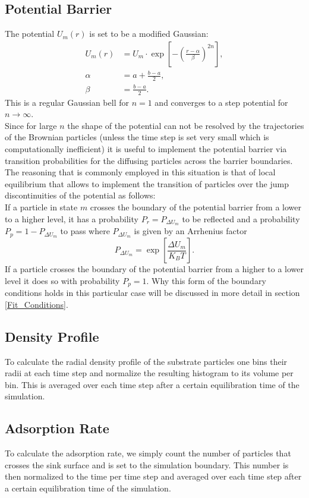 \subsection{Potential Barrier}
The potential $U_m(r)$ is set to be a modified Gaussian:
\begin{align}
    U_m(r) &= U_m \cdot \exp \left[-\left( \frac{r-\alpha}{\beta} \right)^{2n}\right], \nonumber \\
    \alpha &= a + \frac{b-a}{2}, \nonumber \\
    \beta  &= \frac{b-a}{2}.
    \label{mod_gauss}
\end{align}
This is a regular Gaussian bell for $n=1$ and converges to a step potential for $n\rightarrow \infty$. \\
Since for large $n$ the shape of the potential can not be resolved by the trajectories of the Brownian particles (unless the time step is set very small which is computationally inefficient) it is useful to implement the potential barrier via transition probabilities for the diffusing particles across the barrier boundaries. The reasoning that is commonly employed in this situation is that of local equilibrium \cite{glansdorf1971} that allows to implement the transition of particles over the jump discontinuities of the potential as follows: \\
If a particle in state $m$ crosses the boundary of the potential barrier from a lower to a higher level, it has a probability $P_r = P_{\Delta U_m}$ to be reflected and a probability $P_p = 1 - P_{\Delta U_m}$ to pass where $P_{\Delta U_m}$ is given by an Arrhenius factor
\begin{equation}
    P_{ \Delta U_m} = \exp \left[\frac{\Delta U_m}{K_B T}  \right].
    \label{arrhenius_factor}
\end{equation}
If a particle crosses the boundary of the potential barrier from a higher to a lower level it does so with probability $P_p = 1$.
Why this form of the boundary conditions holds in this particular case will be discussed in more detail in section \ref{Fit_Conditions}.
\subsection{Density Profile}
To calculate the radial density profile of the substrate particles one bins their radii at each time step and normalize the resulting histogram to its volume per bin. This is averaged over each time step after a certain equilibration time of the simulation.
\subsection{Adsorption Rate}
To calculate the adsorption rate, we simply count the number of particles that crosses the sink surface and is set to the simulation boundary. This number is then normalized to the time per time step and averaged over each time step after a certain equilibration time of the simulation.

